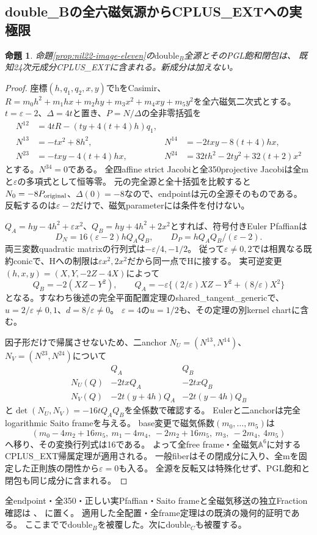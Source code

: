 \documentclass[a4paper,11pt]{ltjsarticle}
\newtheorem{proposition}{命題}[section]
\theoremstyle{definition}
\begin{document}
\subsection{double\_Bの全六磁気源からCPLUS\_EXTへの実極限}
\begin{proposition}\label{prop:nil22-doubleB-CPLUS}
命題\ref{prop:nil22-image-eleven}の$\mathrm{double}_B$全源とそのPGL飽和閉包は、
既知24次元成分CPLUS\_EXTに含まれる。新成分は加えない。
\end{proposition}
\begin{proof}
座標$(h,q_1,q_2,x,y)$でhをCasimir、$R=m_0h^2+m_1hx+m_2hy+m_3x^2+m_4xy+m_5y^2$を全六磁気二次式とする。
$t=\varepsilon-2$、$\Delta=4t$と置き、$P=N/\Delta$の全非零括弧を
\[
\begin{aligned}
 N^{12}&=4tR-(ty+4(t+4)h)q_1,\\
 N^{13}&=-tx^2+8h^2,&N^{14}&=-2txy-8(t+4)hx,\\
 N^{23}&=-txy-4(t+4)hx,&N^{24}&=32th^2-2ty^2+32(t+2)x^2
\end{aligned}
\]
とする。$N^{34}=0$である。
全四affine strict Jacobiと全350projective Jacobiは全mと$\varepsilon$の多項式として恒等零。
元の完全源と全十括弧を比較すると$N_0=-8P_{\rm original}$、$\Delta(0)=-8$なので、endpointは元の全源そのものである。
反転するのは$\varepsilon-2$だけで、磁気parameterには条件を付けない。

$Q_A=hy-4h^2+\varepsilon x^2$、$Q_B=hy+4h^2+2x^2$とすれば、符号付きEuler Pfaffianは
\[
 D_N=16(\varepsilon-2)hQ_AQ_B,\qquad D_P=hQ_AQ_B/(\varepsilon-2).
\]
両三変数quadratic matrixの行列式は$-\varepsilon/4,-1/2$。
従って$\varepsilon\ne0,2$では相異なる既約conicで、Hへの制限は$\varepsilon x^2,2x^2$だから同一点でHに接する。
実可逆変更$(h,x,y)=(X,Y,-2Z-4X)$によって
\[
 Q_B=-2(XZ-Y^2),\qquad
 Q_A=-\varepsilon\{(2/\varepsilon)XZ-Y^2+(8/\varepsilon)X^2\}
\]
となる。すなわち後述の完全平面配置定理のshared\_tangent\_genericで、$u=2/\varepsilon\ne0,1$、$d=8/\varepsilon\ne0$。
$\varepsilon=4$の$u=1/2$も、その定理の別kernel chartに含む。

因子形だけで帰属させないため、二anchor $N_U=(N^{13},N^{14})$、$N_V=(N^{23},N^{24})$について
\[
\begin{array}{c|cc}
 &Q_A&Q_B\\\hline
 N_U(Q)&-2txQ_A&-2txQ_B\\
 N_V(Q)&-2t(y+4h)Q_A&-2t(y-4h)Q_B
\end{array}
\]
と$\det(N_U,N_V)=-16tQ_AQ_B$を全係数で確認する。
Eulerと二anchorは完全logarithmic Saito frameを与える。
base変更で磁気係数$(m_0,\ldots,m_5)$は
\[
 (m_0-4m_2+16m_5,\ m_1-4m_4,\ -2m_2+16m_5,\ m_3,\ -2m_4,\ 4m_5)
\]
へ移り、その変換行列式は16である。
よって全free frame・全磁気$\mathbb A^6$に対するCPLUS\_EXT帰属定理が適用される。
一般fiberはその閉成分に入り、全mを固定した正則族の閉性から$\varepsilon=0$も入る。
全源を反転又は特殊化せず、PGL飽和と閉包も同じ成分に含まれる。
\end{proof}
全endpoint・全350・正しい実Pfaffian・Saito frameと全磁気移送の独立Fraction確認は
、
に置く。
適用した全配置・全frame定理はの既済の幾何的証明である。
ここまでで$\mathrm{double}_B$を被覆した。次に$\mathrm{double}_C$も被覆する。
\end{document}
